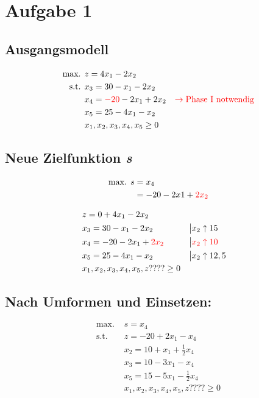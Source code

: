 \documentclass[a4paper,11pt]{article}
\begin{document}
\section*{Aufgabe 1}
\subsection*{Ausgangsmodell}
\begin{align*}
\text{max. } & z = 4x_1 - 2x_2 \\
\text{s.t. } & x_3 = 30 - x_1 - 2x_2 \\
& x_4 = {\color{red} -20} - 2x_1 + 2x_2  & \color{red} \to \text{Phase I notwendig} \\
& x_5 = 25 -4x_1 - x_2 \\
& x_1, x_2, x_3, x_4, x_5 \ge 0 \\
\end{align*}

\subsection*{Neue Zielfunktion \emph{s}}
\begin{align*}
\text{max. } s &= x_4 \\
&= -20 - 2x1 + {\color{red} 2x_2}
\end{align*}

\begin{align*}
& z = 0 + 4x_1 - 2x_2 \\
& x_3 = 30 - x_1 - 2x_2 &&\big| x_2 \uparrow 15 \\
& x_4 = -20 - 2x_1 + {\color{red} 2x_2} &&\big| \color{red} x_2 \uparrow 10 \\
& x_5 = 25 -4x_1 - x_2 &&\big| x_2 \uparrow 12,5 \\
& x_1, x_2, x_3, x_4, x_5, z???? \ge 0 \\
\end{align*}

\subsection*{Nach Umformen und Einsetzen:}
\begin{align*}
\text{max. } & s = x_4 \\
\text{s.t. } & z = -20 + 2x_1 - x_4 \\
& x_2 = 10 + x_1 + \frac{1}{2}x_4 \\
& x_3 = 10 - 3x_1 - x_4 \\
& x_5 = 15 - 5x_1 - \frac{1}{2}x_4 \\
& x_1, x_2, x_3, x_4, x_5, z???? \ge 0
\end{align*}
\end{document}
